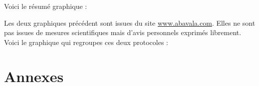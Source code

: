\documentclass[a4paper,10pt]{article}
\begin{document}
Voici le résumé graphique :

Les deux graphiques précédent sont issues du site \url{www.abavala.com}. Elles ne sont pas issues de mesures scientifiques mais d’avis personnels exprimés librement. Voici le graphique qui regroupes ces deux protocoles :


\section{Annexes}


 
\end{document}
